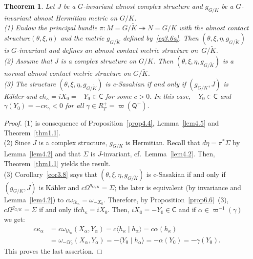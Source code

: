 \documentclass[a4paper,reqno]{amsart}
\newtheorem{thm}{Theorem}[section]
\theoremstyle{definition}
\theoremstyle{remark}
\theoremstyle{plain}
\numberwithin{equation}{section}
\newcommand{\Csf}{{\mathsf{C}}}
\newcommand{\sto}{\twoheadrightarrow}
\newcommand{\ascal}[2]{{\langle {#1}  \mid {#2} \rangle}}
\newcommand{\vpi}{\varpi}
\newcommand{\prootsQ}{\mathsf{Q}^+}
\newcommand{\Kt}{{\widetilde{K}}}
\newcommand{\wK}{{\widetilde{K}}}
\newcommand{\kahler}{K\"ahler\xspace}
\newcommand{\sissi}{if and only if\xspace}
\newcommand{\ACS}{almost contact structure\xspace}
\newcommand{\NACMS}{normal almost contact metric
  structure\xspace}
\newcommand{\ACMS}{almost contact metric
  structure\xspace}
\newcommand{\txe}{{(\theta,\xi,\eta)}}
\newcommand{\txeMK}{{(\theta,\xi,\eta,g_{\scriptscriptstyle{G/\wK}})}}
\begin{document}
\begin{thm}
  \label{thm6.12}
  Let $J$ be a $G$-invariant almost complex structure and
  $g_{\scriptscriptstyle{G/K}}$ be a $G$-invariant almost Hermitian metric on $G/K$.
  \\
  {\rm (1)} Endow the principal bundle
  $\pi : M= G/\wK \sto  N= G/K$ with the \ACS $\txe$ and the
  metric $g_{\scriptscriptstyle{G/\wK}}$ 
  defined by~\eqref{eq3.6a}. Then $\txeMK$ is
  $G$-invariant and defines an \ACMS on~$G/\Kt$.
  \\
  {\rm (2)} Assume that $J$ is a complex structure on $G/K$. Then
  $\txeMK$ is a \NACMS on $G/\Kt$.
  \\
  {\rm (3)} The structure $\txeMK$ is c-Sasakian \sissi
  $(g_{\scriptscriptstyle{G/K}},J)$ is \kahler and
  $ch_\kappa = iX_0 = -Y_0\in \mathsf{C}$ for some $c >0$. In
  this case, $-Y_0 \in \mathsf{C}$ and
  $\gamma(Y_0) = -c\kappa_\gamma < 0$ for all
  $\gamma \in R_T^+= \varpi(\prootsQ)$.
\end{thm}

\begin{proof}
  (1) is consequence of Proposition~\ref{prop4.4},
  Lemma~\ref{lem4.5} and Theorem~\ref{thm1.1}.
  \\
  (2) Since $J$ is a complex structure, $g_{\scriptscriptstyle{G/K}}$ is
  Hermitian. Recall that $d\eta= \pi^*\Sigma$ by
  Lemma~\ref{lem4.2} and that $\Sigma$ is $J$-invariant,
  cf.~Lemma~\ref{lem4.2}. Then, Theorem~\ref{thm1.1}
  yields the result.
  \\
  (3)  Corollary~\ref{cor3.8} says that $\txeMK$ is c-Sasakian \sissi
  $(g_{\scriptscriptstyle{G/K}},J)$ is \kahler and $c\Omega^{g_{\scriptscriptstyle{G/K}}}= \Sigma$; the later
  is equivalent (by invariance and Lemma~\ref{lem4.2}) to 
  $c\omega_{ih_\kappa} = \omega_{-X_0}$. Therefore, by Proposition~\ref{prop6.6}~(3),
  $c\Omega^{g_{\scriptscriptstyle{G/K}}} = \Sigma$ \sissi $ch_\kappa = iX_0$.  Then,
  $iX_0 = -Y_0\in \Csf$ and if $\alpha \in \vpi^{-1}(\gamma)$ we get:
\begin{align*}
c\kappa_\alpha & = c \omega_{ih_\kappa}(X_\alpha,Y_\alpha) =
c\ascal{h_\kappa}{h_\alpha} = c\alpha(h_\kappa) \\ &=
\omega_{-iY_0}(X_\alpha,Y_\alpha) = -\ascal{Y_0}{h_\alpha} =
-\alpha(Y_0) = - \gamma(Y_0).
\end{align*}
 This proves the last assertion.
\end{proof}
\end{document}
